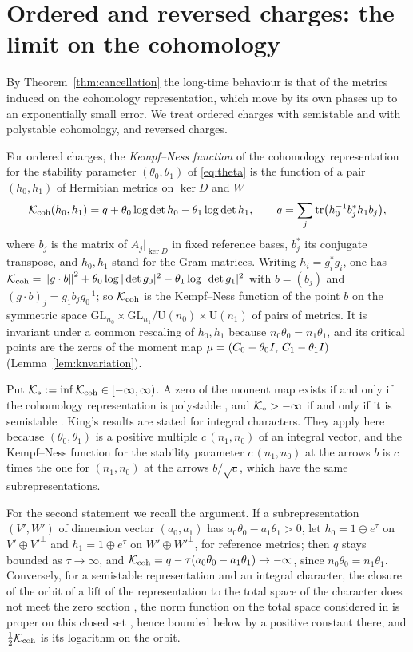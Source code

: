 \section{Ordered and reversed charges: the limit on the cohomology}\label{sec:convergence}

By Theorem~\ref{thm:cancellation} the long-time behaviour is that of the
metrics induced on the cohomology representation, which move by its own
phases up to an exponentially small error. We treat ordered charges with
semistable and with polystable cohomology, and reversed charges.

For ordered charges, the \emph{Kempf--Ness function} of the cohomology
representation for the stability parameter $(\theta_0,\theta_1)$ of
\eqref{eq:theta} is the function of a pair $(h_0,h_1)$ of Hermitian metrics
on $\ker D$ and $W$
\begin{equation}\label{eq:KN}
 \mathcal K_{\mathrm{coh}}(h_0,h_1)=q+\theta_0\log\det h_0-\theta_1\log\det h_1,\qquad
 q=\sum_j\operatorname{tr}\bigl(h_0^{-1}b_j^*h_1b_j\bigr),
\end{equation}
where $b_j$ is the matrix of $A_j|_{\ker D}$ in fixed reference bases,
$b_j^*$ its conjugate transpose, and $h_0,h_1$ stand for the Gram
matrices. Writing $h_i=g_i^*g_i$, one has
$\mathcal K_{\mathrm{coh}}=\left\lVert g\cdot b\right\rVert^2+\theta_0\log|\det g_0|^2-\theta_1\log|\det g_1|^2$
with $b=(b_j)$ and $(g\cdot b)_j=g_1b_jg_0^{-1}$; so $\mathcal K_{\mathrm{coh}}$ is the
Kempf--Ness function of the point $b$ on the symmetric space
$\mathrm{GL}_{n_0}\times\mathrm{GL}_{n_1}/\mathrm U(n_0)\times\mathrm U(n_1)$
of pairs of metrics. It is invariant under a common rescaling of $h_0,h_1$ because
$n_0\theta_0=n_1\theta_1$, and its critical points are the zeros of the
moment map $\mu=(C_0-\theta_0I,\,C_1-\theta_1I)$
(Lemma~\ref{lem:knvariation}).

Put $\mathcal K_*:=\inf\mathcal K_{\mathrm{coh}}\in[-\infty,\infty)$. A zero of the moment map exists
if and only if the cohomology representation is polystable
\cite[Proposition~6.5]{kin94}, and $\mathcal K_*>-\infty$ if and only if it is
semistable \cite[Theorem~5.1]{hkkp23}. King's results are stated for integral
characters. They apply here because $(\theta_0,\theta_1)$ is a positive
multiple $c\,(n_1,n_0)$ of an integral vector, and the Kempf--Ness function
for the stability parameter $c\,(n_1,n_0)$ at the arrows $b$ is $c$ times
the one for $(n_1,n_0)$ at the arrows $b/\sqrt c$, which have the same
subrepresentations.

For the second statement we recall the argument. If a subrepresentation
$(V',W')$ of dimension vector $(a_0,a_1)$ has $a_0\theta_0-a_1\theta_1>0$, let
$h_0=1\oplus e^\tau$ on $V'\oplus V'^\perp$ and $h_1=1\oplus e^\tau$ on
$W'\oplus W'^\perp$, for reference metrics; then $q$ stays bounded as
$\tau\to\infty$, and
$\mathcal K_{\mathrm{coh}}=q-\tau(a_0\theta_0-a_1\theta_1)\to-\infty$, since
$n_0\theta_0=n_1\theta_1$. Conversely, for a semistable representation and
an integral character, the closure of the orbit of a lift of the
representation to the total space of the character does not meet the zero
section \cite[Proposition~3.1 and Lemma~2.2]{kin94}, the norm function on
the total space considered in \cite[\S6]{kin94} is proper on this closed set
\cite[Lemma~6.3]{kin94}, hence bounded below by a
positive constant there, and $\frac12\mathcal K_{\mathrm{coh}}$ is its logarithm on the
orbit.

